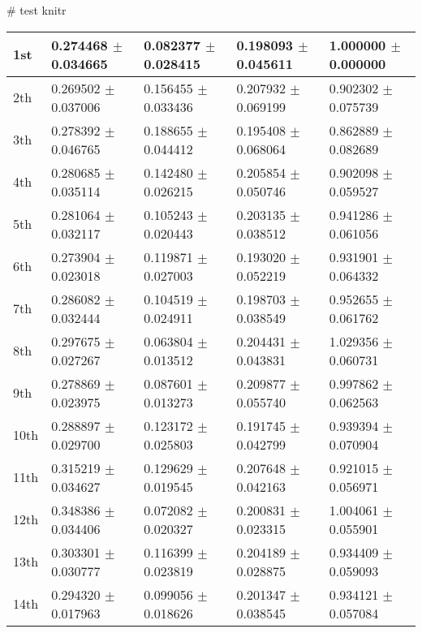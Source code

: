 
# test knitr

\begin{knitrout}
\color{fgcolor}\begin{kframe}
\begin{alltt}
\end{alltt}
\end{kframe}
\begin{tabular}{l|l|l|l|l}
\hline
1st & 0.274468 $\pm$ 0.034665 & 0.082377 $\pm$ 0.028415 & 0.198093 $\pm$ 0.045611 & 1.000000 $\pm$ 0.000000\\
\hline
2th & 0.269502 $\pm$ 0.037006 & 0.156455 $\pm$ 0.033436 & 0.207932 $\pm$ 0.069199 & 0.902302 $\pm$ 0.075739\\
\hline
3th & 0.278392 $\pm$ 0.046765 & 0.188655 $\pm$ 0.044412 & 0.195408 $\pm$ 0.068064 & 0.862889 $\pm$ 0.082689\\
\hline
4th & 0.280685 $\pm$ 0.035114 & 0.142480 $\pm$ 0.026215 & 0.205854 $\pm$ 0.050746 & 0.902098 $\pm$ 0.059527\\
\hline
5th & 0.281064 $\pm$ 0.032117 & 0.105243 $\pm$ 0.020443 & 0.203135 $\pm$ 0.038512 & 0.941286 $\pm$ 0.061056\\
\hline
6th & 0.273904 $\pm$ 0.023018 & 0.119871 $\pm$ 0.027003 & 0.193020 $\pm$ 0.052219 & 0.931901 $\pm$ 0.064332\\
\hline
7th & 0.286082 $\pm$ 0.032444 & 0.104519 $\pm$ 0.024911 & 0.198703 $\pm$ 0.038549 & 0.952655 $\pm$ 0.061762\\
\hline
8th & 0.297675 $\pm$ 0.027267 & 0.063804 $\pm$ 0.013512 & 0.204431 $\pm$ 0.043831 & 1.029356 $\pm$ 0.060731\\
\hline
9th & 0.278869 $\pm$ 0.023975 & 0.087601 $\pm$ 0.013273 & 0.209877 $\pm$ 0.055740 & 0.997862 $\pm$ 0.062563\\
\hline
10th & 0.288897 $\pm$ 0.029700 & 0.123172 $\pm$ 0.025803 & 0.191745 $\pm$ 0.042799 & 0.939394 $\pm$ 0.070904\\
\hline
11th & 0.315219 $\pm$ 0.034627 & 0.129629 $\pm$ 0.019545 & 0.207648 $\pm$ 0.042163 & 0.921015 $\pm$ 0.056971\\
\hline
12th & 0.348386 $\pm$ 0.034406 & 0.072082 $\pm$ 0.020327 & 0.200831 $\pm$ 0.023315 & 1.004061 $\pm$ 0.055901\\
\hline
13th & 0.303301 $\pm$ 0.030777 & 0.116399 $\pm$ 0.023819 & 0.204189 $\pm$ 0.028875 & 0.934409 $\pm$ 0.059093\\
\hline
14th & 0.294320 $\pm$ 0.017963 & 0.099056 $\pm$ 0.018626 & 0.201347 $\pm$ 0.038545 & 0.934121 $\pm$ 0.057084\\

\end{tabular}
\end{knitrout}
